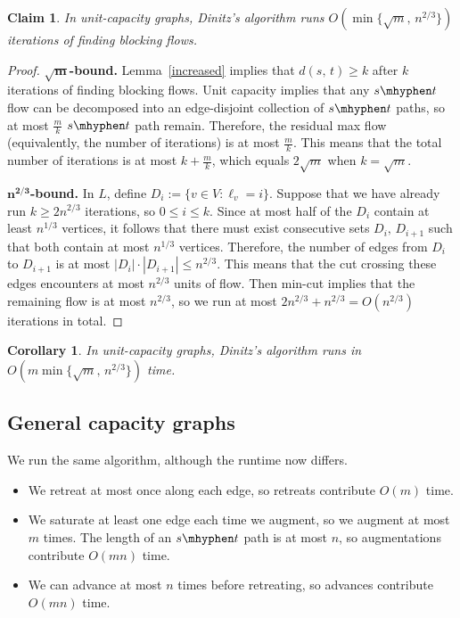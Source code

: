 \documentclass[11pt]{article}
\newtheorem*{corollary}{Corollary}
\newtheorem*{claim}{Claim}
\begin{document}
\begin{claim}
In unit-capacity graphs, Dinitz's algorithm runs $O(\min\{\sqrt{m},\, n^{2/3}\})$ iterations of finding blocking flows.
\end{claim}
\begin{proof}
$\mathbf{\sqrt{m}}$\textbf{-bound.}
\noindent Lemma~\ref{increased} implies that $d(s,\, t)\geq k$ after $k$ iterations of finding blocking flows. Unit capacity implies that any $s\mhyphen t$ flow can be decomposed into an edge-disjoint collection of $s\mhyphen t$ paths, so at most $\frac{m}{k}$ $s\mhyphen t$ path remain. Therefore, the residual max flow (equivalently, the number of iterations) is at most $\frac{m}{k}$. This means that the total number of iterations is at most $k+\frac{m}{k}$, which equals $2\sqrt{m}$ when $k=\sqrt{m}$.

$\mathbf{n^{2/3}}$\textbf{-bound.} 
In $L$, define $D_i:=\{v\in V:\ell_v=i\}$. Suppose that we have already run $k\geq 2n^{2/3}$ iterations, so $0\leq i\leq k$. Since at most half of the $D_i$ contain at least $n^{1/3}$ vertices, it follows that there must exist consecutive sets $D_i,\, D_{i+1}$ such that both contain at most $n^{1/3}$ vertices. Therefore, the number of edges from $D_i$ to $D_{i+1}$ is at most $|D_i|\cdot|D_{i+1}|\leq n^{2/3}$. This means that the cut crossing these edges encounters at most $n^{2/3}$ units of flow. Then min-cut implies that the remaining flow is at most $n^{2/3}$, so we run at most $2n^{2/3}+n^{2/3}=O(n^{2/3})$ iterations in total. 
\end{proof}

\begin{corollary}
In unit-capacity graphs, Dinitz's algorithm runs in $O(m\min\{\sqrt{m},\, n^{2/3}\})$ time.
\end{corollary}

\subsection{General capacity graphs}
We run the same algorithm, although the runtime now differs. 

\begin{itemize}
\item We retreat at most once along each edge, so retreats contribute $O(m)$ time. 
\item We saturate at least one edge each time we augment, so we augment at most $m$ times. The length of an $s\mhyphen t$ path is at most $n$, so augmentations contribute $O(mn)$ time. \item We can advance at most $n$ times before retreating, so advances contribute $O(mn)$ time. 
\end{itemize} 
\end{document}
